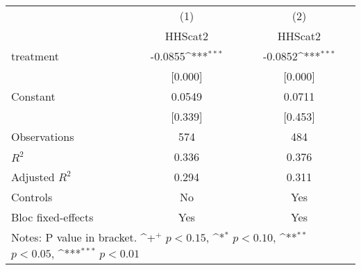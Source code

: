 {
\def\sym#1{\ifmmode^{#1}\else\(^{#1}\)\fi}
\begin{tabular*}{1.2\hsize}{@{\hskip\tabcolsep\extracolsep\fill}l*{2}{c}}
\hline\hline
     &\multicolumn{1}{c}{(1)}&\multicolumn{1}{c}{(2)}\\
     &\multicolumn{1}{c}{HHScat2}&\multicolumn{1}{c}{HHScat2}\\
\hline
treatment&-0.0855\sym{***}&-0.0852\sym{***}\\
     &[0.000]         &[0.000]         \\
[1em]
Constant&0.0549         &0.0711         \\
     &[0.339]         &[0.453]         \\
\hline
Observations&574         &484         \\
\(R^{2}\)&0.336         &0.376         \\
Adjusted \(R^{2}\)&0.294         &0.311         \\
Controls&No         &Yes         \\
Bloc fixed-effects&Yes         &Yes         \\
\hline\hline
\multicolumn{3}{p{1.0\textwidth}}{\footnotesize Notes: P value in bracket. \sym{+} \(p<0.15\), \sym{*} \(p<0.10\), \sym{**} \(p<0.05\), \sym{***} \(p<0.01\)}\\
\end{tabular*}
}

